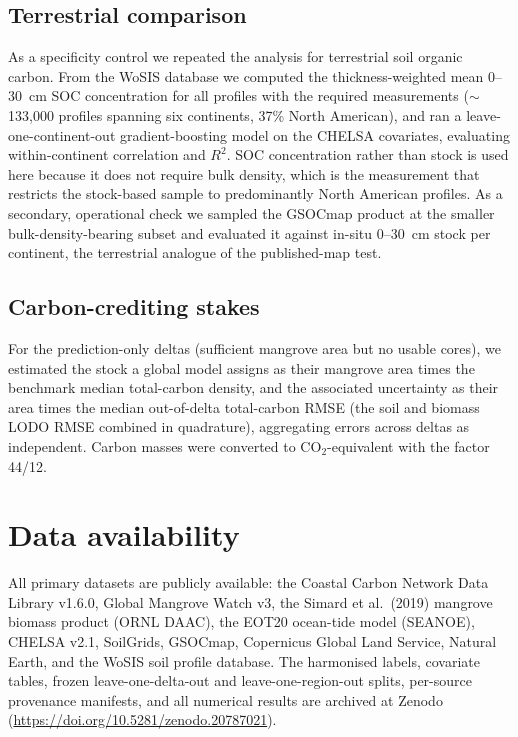 \documentclass[11pt]{article}
\begin{document}
\subsection{Terrestrial comparison}
As a specificity control we repeated the analysis for terrestrial soil organic carbon.
From the WoSIS database we computed the thickness-weighted mean 0--30~cm SOC concentration
for all profiles with the required measurements ($\sim$133{,}000 profiles spanning six
continents, 37\% North American), and ran a leave-one-continent-out gradient-boosting
model on the CHELSA covariates, evaluating within-continent correlation and $R^2$. SOC
concentration rather than stock is used here because it does not require bulk density,
which is the measurement that restricts the stock-based sample to predominantly North
American profiles. As a secondary, operational check we sampled the GSOCmap product at
the smaller bulk-density-bearing subset and evaluated it against in-situ 0--30~cm stock
per continent, the terrestrial analogue of the published-map test.

\subsection{Carbon-crediting stakes}
For the prediction-only deltas (sufficient mangrove area but no usable cores), we
estimated the stock a global model assigns as their mangrove area times the benchmark
median total-carbon density, and the associated uncertainty as their area times the
median out-of-delta total-carbon RMSE (the soil and biomass LODO RMSE combined in
quadrature), aggregating errors across deltas as independent. Carbon masses were
converted to CO$_2$-equivalent with the factor 44/12.

\section*{Data availability}
All primary datasets are publicly available: the Coastal Carbon Network Data Library
v1.6.0, Global Mangrove Watch v3, the Simard et al.\ (2019) mangrove biomass product
(ORNL DAAC), the EOT20 ocean-tide model (SEANOE), CHELSA v2.1, SoilGrids, GSOCmap,
Copernicus Global Land Service, Natural Earth, and the WoSIS soil profile database. The
harmonised labels, covariate tables, frozen leave-one-delta-out and leave-one-region-out
splits, per-source provenance manifests, and all numerical results are archived at Zenodo
(\url{https://doi.org/10.5281/zenodo.20787021}).
\end{document}
